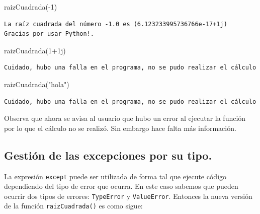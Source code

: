 \documentclass[
  spanish,
  letterpaper,
]{scrbook}
\newenvironment{Shaded}{\begin{snugshade}}{\end{snugshade}}
\newcommand{\DecValTok}[1]{\textcolor[rgb]{0.68,0.00,0.00}{#1}}
\newcommand{\NormalTok}[1]{\textcolor[rgb]{0.00,0.23,0.31}{#1}}
\newcommand{\OperatorTok}[1]{\textcolor[rgb]{0.37,0.37,0.37}{#1}}
\newcommand{\OtherTok}[1]{\textcolor[rgb]{0.00,0.23,0.31}{#1}}
\newcommand{\StringTok}[1]{\textcolor[rgb]{0.13,0.47,0.30}{#1}}
\theoremstyle{definition}
\theoremstyle{remark}
\begin{document}
\begin{Shaded}
\begin{Highlighting}[]
\NormalTok{raizCuadrada(}\OperatorTok{{-}}\DecValTok{1}\NormalTok{)}
\end{Highlighting}
\end{Shaded}

\begin{verbatim}
La raíz cuadrada del número -1.0 es (6.123233995736766e-17+1j)
Gracias por usar Python!.
\end{verbatim}

\begin{Shaded}
\begin{Highlighting}[]
\NormalTok{raizCuadrada(}\DecValTok{1}\OperatorTok{+}\OtherTok{1j}\NormalTok{)}
\end{Highlighting}
\end{Shaded}

\begin{verbatim}
Cuidado, hubo una falla en el programa, no se pudo realizar el cálculo
\end{verbatim}

\begin{Shaded}
\begin{Highlighting}[]
\NormalTok{raizCuadrada(}\StringTok{"hola"}\NormalTok{)}
\end{Highlighting}
\end{Shaded}

\begin{verbatim}
Cuidado, hubo una falla en el programa, no se pudo realizar el cálculo
\end{verbatim}

Observa que ahora se avisa al usuario que hubo un error al ejecutar la
función por lo que el cálculo no se realizó. Sin embargo hace falta más
información.

\subsection{Gestión de las excepciones por su
tipo.}\label{gestiuxf3n-de-las-excepciones-por-su-tipo.}

La expresión \texttt{except} puede ser utilizada de forma tal que
ejecute código dependiendo del tipo de error que ocurra. En este caso
sabemos que pueden ocurrir dos tipos de errores: \texttt{TypeError} y
\texttt{ValueError}. Entonces la nueva versión de la función
\texttt{raizCuadrada()} es como sigue:
\end{document}
